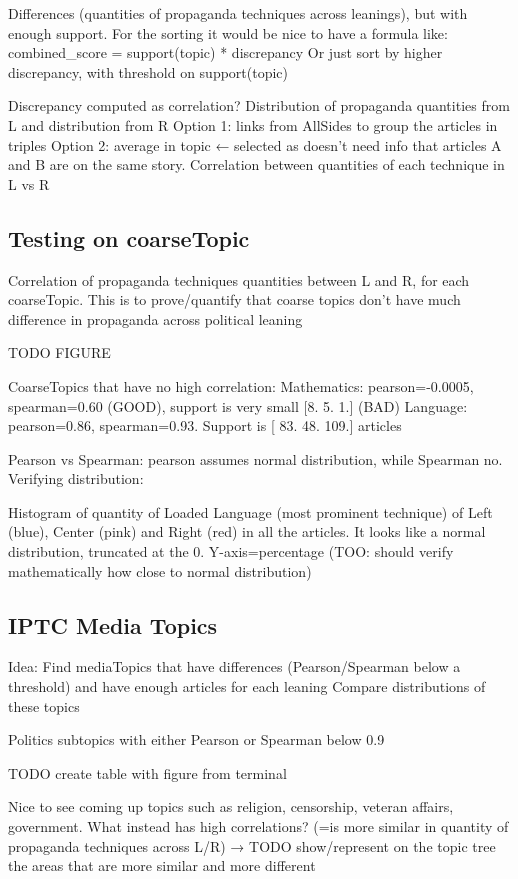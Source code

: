 Differences (quantities of propaganda techniques across leanings), but with enough support. For the sorting it would be nice to have a formula like: 
combined\_score = support(topic) * discrepancy
Or just sort by higher discrepancy, with threshold on support(topic)

Discrepancy computed as correlation?
Distribution of propaganda quantities from L and distribution from R
Option 1: links from AllSides to group the articles in triples
Option 2: average in topic ← selected as doesn’t need info that articles A and B are on the same story. Correlation between quantities of each technique in L vs R

\subsection{Testing on coarseTopic}
Correlation of propaganda techniques quantities between L and R, for each coarseTopic. This is to prove/quantify that coarse topics don’t have much difference in propaganda across political leaning

TODO FIGURE

CoarseTopics that have no high correlation:
Mathematics: pearson=-0.0005, spearman=0.60 (GOOD), support is very small [8. 5. 1.] (BAD)
Language: pearson=0.86, spearman=0.93. Support is [ 83.  48. 109.] articles

Pearson vs Spearman: pearson assumes normal distribution, while Spearman no.
Verifying distribution:

Histogram of quantity of Loaded Language (most prominent technique) of Left (blue), Center (pink) and Right (red) in all the articles. It looks like a normal distribution, truncated at the 0. Y-axis=percentage (TOO: should verify mathematically how close to normal distribution)

\subsection{IPTC Media Topics}
Idea:
Find mediaTopics that have differences (Pearson/Spearman below a threshold) and have enough articles for each leaning
Compare distributions of these topics

Politics subtopics with either Pearson or Spearman below 0.9

TODO create table with figure from terminal

Nice to see coming up topics such as religion, censorship, veteran affairs, government.
What instead has high correlations? (=is more similar in quantity of propaganda techniques across L/R) → TODO show/represent on the topic tree the areas that are more similar and more different


